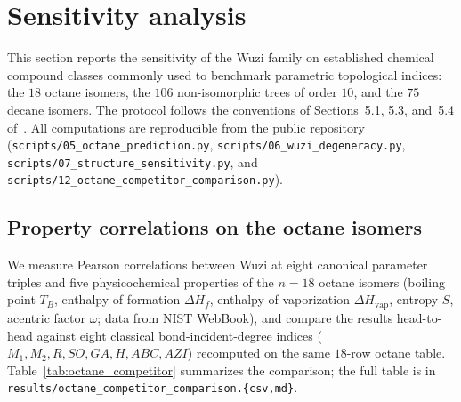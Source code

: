\documentclass[11pt,a4paper]{article}
\theoremstyle{definition}
\begin{document}
\section{Sensitivity analysis}\label{sec:sensitivity}

This section reports the sensitivity of the Wuzi family on
established chemical compound classes commonly used to benchmark
parametric topological indices: the $18$ octane isomers, the
$106$ non-isomorphic trees of order $10$, and the $75$ decane
isomers. The protocol follows the conventions of
Sections~5.1, 5.3, and~5.4 of~\cite{MovahediGutmanRedzepovicFurtula2026}.
All computations are reproducible from the public repository
(\texttt{scripts/05\_octane\_prediction.py},
\texttt{scripts/06\_wuzi\_degeneracy.py},
\texttt{scripts/07\_structure\_sensitivity.py}, and
\texttt{scripts/12\_octane\_competitor\_comparison.py}).

\subsection{Property correlations on the octane isomers}\label{sec:octanes}

We measure Pearson correlations between Wuzi at eight canonical
parameter triples and five physicochemical properties of the
$n=18$ octane isomers (boiling point $T_B$, enthalpy of formation
$\Delta H_f$, enthalpy of vaporization $\Delta H_\mathrm{vap}$,
entropy $S$, acentric factor $\omega$; data from NIST WebBook),
and compare the results head-to-head against eight classical
bond-incident-degree indices ($M_1, M_2, R, SO, GA, H, ABC, AZI$)
recomputed on the same $18$-row octane table.
Table~\ref{tab:octane_competitor} summarizes the comparison; the
full table is in \texttt{results/octane\_competitor\_comparison.\{csv,md\}}.
\end{document}

